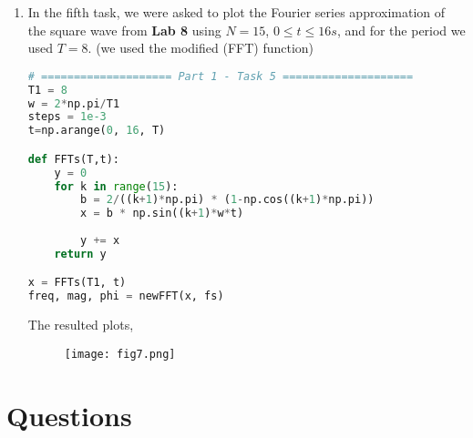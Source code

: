 \documentclass[12pt,a4paper]{article}
\begin{document}
\begin{itemize}
\begin{enumerate}
    \item
    In the fifth task, we were asked to plot the Fourier series approximation of the square wave from \textbf{Lab 8} using $N = 15$, $ 0\leq t \leq16s$, and for the period we used $T = 8$. (we used the modified (FFT) function)\\

\begin{lstlisting}[language=Python, caption={Task 2, Part 1}, label={lst:code}, mathescape=true, breaklines=true]
# ==================== Part 1 - Task 5 ====================
T1 = 8
w = 2*np.pi/T1
steps = 1e-3
t=np.arange(0, 16, T)

def FFTs(T,t):
    y = 0
    for k in range(15):
        b = 2/((k+1)*np.pi) * (1-np.cos((k+1)*np.pi))
        x = b * np.sin((k+1)*w*t)
        
        y += x
    return y

x = FFTs(T1, t)
freq, mag, phi = newFFT(x, fs)
\end{lstlisting} 

    The resulted plots,

\begin{figure}[h]
    \centering
    \texttt{[image: fig7.png]}
\end{figure}\textbf{}

\end{enumerate}
\end{itemize}
\clearpage

\section{Questions}\label{sec:res}
\end{document}
